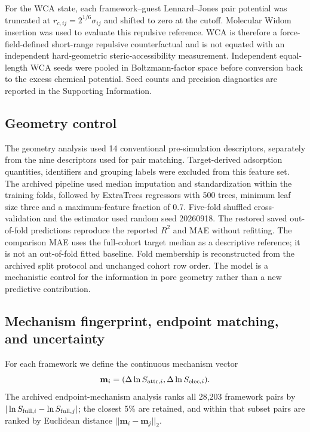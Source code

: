 \documentclass[journal=jctcce,manuscript=article]{achemso}
\begin{document}
For the WCA state, each framework--guest Lennard--Jones pair potential was truncated at
$r_{c,ij}=2^{1/6}\sigma_{ij}$ and shifted to zero at the cutoff. Molecular Widom insertion \cite{widom1963} was used to evaluate this repulsive reference. WCA is therefore a force-field-defined short-range repulsive counterfactual and is not equated with an independent hard-geometric steric-accessibility measurement. Independent equal-length WCA seeds were pooled in Boltzmann-factor space before conversion back to the excess chemical potential. Seed counts and precision diagnostics are reported in the Supporting Information.


\subsection{Geometry control}


The geometry analysis used 14 conventional pre-simulation descriptors, separately from the nine descriptors used for pair matching. Target-derived adsorption quantities, identifiers and grouping labels were excluded from this feature set. The archived pipeline used median imputation and standardization within the training folds, followed by ExtraTrees regressors with 500 trees, minimum leaf size three and a maximum-feature fraction of 0.7. Five-fold shuffled cross-validation and the estimator used random seed 20260918. The restored saved out-of-fold predictions reproduce the reported $R^2$ and MAE without refitting. The comparison MAE uses the full-cohort target median as a descriptive reference; it is not an out-of-fold fitted baseline. Fold membership is reconstructed from the archived split protocol and unchanged cohort row order. The model is a mechanistic control for the information in pore geometry rather than a new predictive contribution.


\subsection{Mechanism fingerprint, endpoint matching, and uncertainty}


For each framework we define the continuous mechanism vector
\begin{equation}
\mathbf{m}_i=(\Delta\ln S_{{\rm attr},i},\Delta\ln S_{{\rm elec},i}).
\end{equation}
The archived endpoint-mechanism analysis ranks all 28,203 framework pairs by $|\ln S_{{\rm full},i}-\ln S_{{\rm full},j}|$; the closest 5\% are retained, and within that subset pairs are ranked by Euclidean distance $||\mathbf{m}_i-\mathbf{m}_j||_2$.
\end{document}
